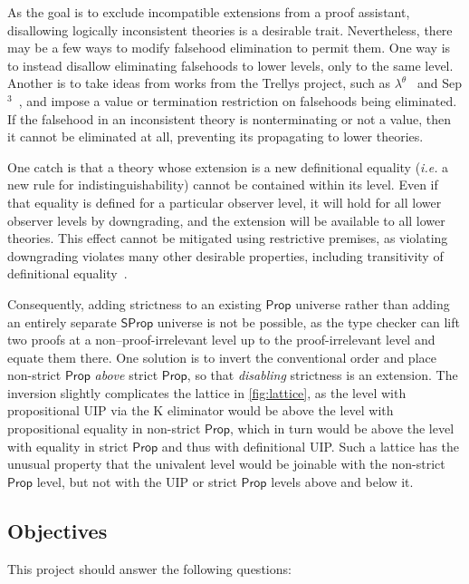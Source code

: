 \documentclass{article}
\makeatletter
\newcommand{\ie}{\textit{i.e.}\@\xspace}
\newcommand{\kw}[1]{\mathsf{#1}}
\makeatother
\begin{document}
As the goal is to exclude incompatible extensions from a proof assistant,
disallowing logically inconsistent theories is a desirable trait.
Nevertheless, there may be a few ways to modify falsehood elimination to permit them.
One way is to instead disallow eliminating falsehoods to lower levels,
only to the same level.
Another is to take ideas from works from the Trellys project,
such as $\lambda^\theta$~\citep{lambda-theta} and Sep$^3$~\citep{sep3},
and impose a value or termination restriction on falsehoods being eliminated.
If the falsehood in an inconsistent theory is nonterminating or not a value,
then it cannot be eliminated at all,
preventing its propagating to lower theories.

One catch is that a theory whose extension is a new definitional equality
(\ie a new rule for indistinguishability) cannot be contained within its level.
Even if that equality is defined for a particular observer level,
it will hold for all lower observer levels by downgrading,
and the extension will be available to all lower theories.
This effect cannot be mitigated using restrictive premises,
as violating downgrading violates many other desirable properties,
including transitivity of definitional equality~\citep{dcoi-omega}.

Consequently, adding strictness to an existing $\kw{Prop}$ universe
rather than adding an entirely separate $\kw{SProp}$ universe is not be possible,
as the type checker can lift two proofs at a non--proof-irrelevant level
up to the proof-irrelevant level and equate them there.
One solution is to invert the conventional order
and place non-strict $\kw{Prop}$ \emph{above} strict $\kw{Prop}$,
so that \emph{disabling} strictness is an extension.
The inversion slightly complicates the lattice in \cref{fig:lattice},
as the level with propositional UIP via the K eliminator
would be above the level with propositional equality in non-strict $\kw{Prop}$,
which in turn would be above the level with equality in strict $\kw{Prop}$
and thus with definitional UIP.
Such a lattice has the unusual property that the univalent level
would be joinable with the non-strict $\kw{Prop}$ level,
but not with the UIP or strict $\kw{Prop}$ levels above and below it.

\subsection{Objectives}

This project should answer the following questions:
\end{document}
